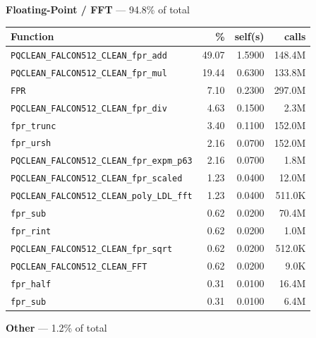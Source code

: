 \documentclass[11pt,a4paper]{article}
\begin{document}
\noindent\colorbox{fpcolor}{\strut \textbf{Floating-Point / FFT} --- 94.8\% of total}
\vspace{2pt}

\begin{longtable}{p{7.5cm}rrr}
\toprule
Function & \% & self(s) & calls \\
\midrule
\endhead
  \texttt{PQCLEAN\_FALCON512\_CLEAN\_fpr\_add} & 49.07 & 1.5900 & 148.4M \\
  \texttt{PQCLEAN\_FALCON512\_CLEAN\_fpr\_mul} & 19.44 & 0.6300 & 133.8M \\
  \texttt{FPR} & 7.10 & 0.2300 & 297.0M \\
  \texttt{PQCLEAN\_FALCON512\_CLEAN\_fpr\_div} & 4.63 & 0.1500 & 2.3M \\
  \texttt{fpr\_trunc} & 3.40 & 0.1100 & 152.0M \\
  \texttt{fpr\_ursh} & 2.16 & 0.0700 & 152.0M \\
  \texttt{PQCLEAN\_FALCON512\_CLEAN\_fpr\_expm\_p63} & 2.16 & 0.0700 & 1.8M \\
  \texttt{PQCLEAN\_FALCON512\_CLEAN\_fpr\_scaled} & 1.23 & 0.0400 & 12.0M \\
  \texttt{PQCLEAN\_FALCON512\_CLEAN\_poly\_LDL\_fft} & 1.23 & 0.0400 & 511.0K \\
  \texttt{fpr\_sub} & 0.62 & 0.0200 & 70.4M \\
  \texttt{fpr\_rint} & 0.62 & 0.0200 & 1.0M \\
  \texttt{PQCLEAN\_FALCON512\_CLEAN\_fpr\_sqrt} & 0.62 & 0.0200 & 512.0K \\
  \texttt{PQCLEAN\_FALCON512\_CLEAN\_FFT} & 0.62 & 0.0200 & 9.0K \\
  \texttt{fpr\_half} & 0.31 & 0.0100 & 16.4M \\
  \texttt{fpr\_sub} & 0.31 & 0.0100 & 6.4M \\
\bottomrule
\end{longtable}

\noindent\colorbox{othercolor}{\strut \textbf{Other} --- 1.2\% of total}
\vspace{2pt}
\end{document}
